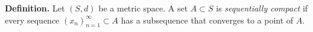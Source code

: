 \textbf{Definition.} Let $(S, d)$ be a metric space. A set $A \subset S$ is \textit{sequentially compact} if every sequence $(x_n)_{n=1}^{\infty} \subset A$ has a subsequence that converges to a point of $A$.
